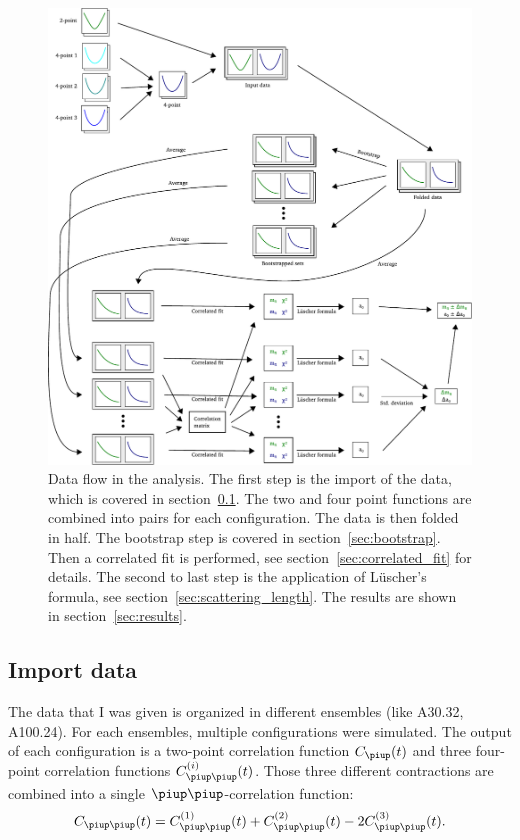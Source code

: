 \documentclass[11pt, english, fleqn, DIV=15, headinclude]{scrartcl}
\begin{document}
\begin{figure}[htbp]
    \centering
    \includegraphics[width=\linewidth]{sketches/Zeichnung.pdf}
    \caption{%
        Data flow in the analysis. The first step is the import of the data,
        which is covered in section~\ref{sec:import}. The two and four point
        functions are combined into pairs for each configuration. The data is
        then folded in half. The bootstrap step is covered in
        section~\ref{sec:bootstrap}. Then a correlated fit is performed, see
        section~\ref{sec:correlated_fit} for details. The second to last step
        is the application of Lüscher's formula, see
        section~\ref{sec:scattering_length}. The results are shown in
        section~\ref{sec:results}.
    }
    \label{fig:analysis-flow}
\end{figure}

\subsection{Import data}
\label{sec:import}

The data that I was given is organized in different ensembles (like A30.32,
A100.24). For each ensembles, multiple configurations were simulated. The
output of each configuration is a two-point correlation function $C_\piup(t)$
and three four-point correlation functions $C_{\piup\piup}^{(i)}(t)$. Those
three different contractions are combined into a single
$\piup\piup$-correlation function:
\begin{equation}
    C_{\piup\piup}(t) = C_{\piup\piup}^{(1)}(t) + C_{\piup\piup}^{(2)}(t)
    - 2 C_{\piup\piup}^{(3)}(t).
\end{equation}
\end{document}
